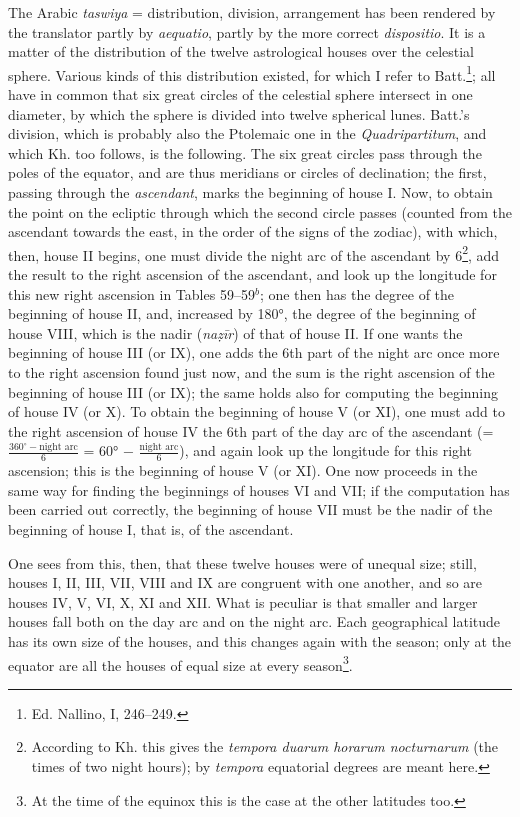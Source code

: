 \documentclass[11pt]{article}
\newcommand{\Pg}[1]{\marginpar{\footnotesize\color{gray}#1}}
\begin{document}
\par \Pg{97}The Arabic \emph{taswiya} = distribution, division, arrangement has been rendered by the translator partly by \emph{aequatio}, partly by the more correct \emph{dispositio}. It is a matter of the distribution of the twelve astrological houses over the celestial sphere. Various kinds of this distribution existed, for which I refer to Batt.\footnote{Ed. Nallino, I, 246–249.}; all have in common that six great circles of the celestial sphere intersect in one diameter, by which the sphere is divided into twelve spherical lunes. Batt.'s division, which is probably also the Ptolemaic one in the \emph{Quadripartitum}, and which Kh. too follows, is the following. The six great circles pass through the poles of the equator, and are thus meridians or circles of declination; the first, passing through the \emph{ascendant}, marks the beginning of house I. Now, to obtain the point on the ecliptic through which the second circle passes (counted from the ascendant towards the east, in the order of the signs of the zodiac), with which, then, house II begins, one must divide the night arc of the ascendant by 6\footnote{According to Kh. this gives the \emph{tempora duarum horarum nocturnarum} (the times of two night hours); by \emph{tempora} equatorial degrees are meant here.}, add the result to the right ascension of the ascendant, and look up the longitude for this new right ascension in Tables 59–59$^{b}$; one then has the degree of the beginning of house II, and, increased by 180°, the degree of the beginning of house VIII, which is the nadir (\emph{naẓīr}) of that of house II. If one wants the beginning of house III (or IX), one adds the 6th part of the night arc once more to the right ascension found just now, and the sum is the right ascension of the beginning of house III (or IX); the same holds also for computing the beginning of house IV (or X). To obtain the beginning of house V (or XI), one must add to the right ascension of house IV the 6th part of the day arc of the ascendant (= $\tfrac{360^{\circ} - \text{night arc}}{6}$ = 60° − $\tfrac{\text{night arc}}{6}$), and again look up the longitude for this right ascension; this is the beginning of house V (or XI). One now proceeds in the same way for finding the beginnings of houses VI and VII; if the computation has been carried out correctly, the beginning of house VII must be the nadir of the beginning of house I, that is, of the ascendant.\par
\par One sees from this, then, that these twelve houses were of unequal size; still, houses I, II, III, VII, VIII and IX are congruent with one another, and so are houses IV, V, VI, X, XI and XII. What is peculiar is that smaller and larger houses fall both on the day arc and on the night arc. Each geographical latitude has its own size of the houses, and this changes again with the season; only at the equator are all the houses of equal size at every season\footnote{At the time of the equinox this is the case at the other latitudes too.}.\par
\end{document}
